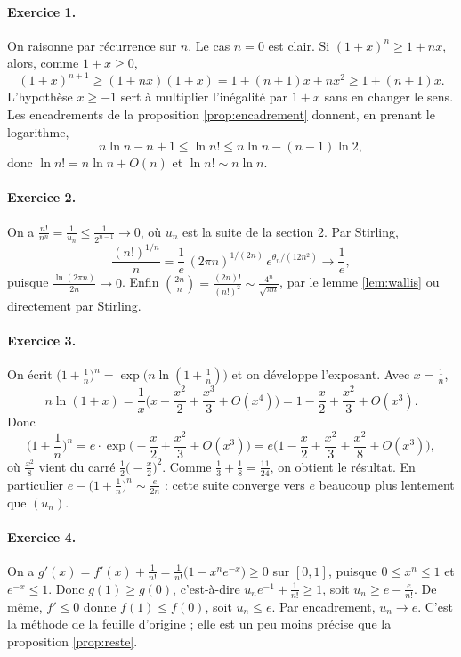 \documentclass[11pt,a4paper]{article}
\theoremstyle{plain}
\theoremstyle{definition}
\theoremstyle{remark}
\begin{document}
\paragraph{Exercice 1.} On raisonne par récurrence sur $n$. Le cas $n=0$ est clair. Si $(1+x)^n\geq1+nx$, alors, comme $1+x\geq0$,
\[
  (1+x)^{n+1}\geq(1+nx)(1+x)=1+(n+1)x+nx^2\geq1+(n+1)x .
\]
L'hypothèse $x\geq-1$ sert à multiplier l'inégalité par $1+x$ sans en changer le sens. Les encadrements de la proposition \ref{prop:encadrement} donnent, en prenant le logarithme,
\[
  n\ln n-n+1\leq\ln n!\leq n\ln n-(n-1)\ln2 ,
\]
donc $\ln n!=n\ln n+O(n)$ et $\ln n!\sim n\ln n$.

\paragraph{Exercice 2.} On a $\frac{n!}{n^n}=\frac1{u_n}\leq\frac1{2^{n-1}}\to0$, où $u_n$ est la suite de la section 2. Par Stirling,
\[
  \frac{(n!)^{1/n}}n=\frac1e\,(2\pi n)^{1/(2n)}\,e^{\theta_n/(12n^2)}\longrightarrow\frac1e ,
\]
puisque $\frac{\ln(2\pi n)}{2n}\to0$. Enfin $\binom{2n}n=\frac{(2n)!}{(n!)^2}\sim\frac{4^n}{\sqrt{\pi n}}$, par le lemme \ref{lem:wallis} ou directement par Stirling.

\paragraph{Exercice 3.} On écrit $\big(1+\frac1n\big)^n=\exp\big(n\ln(1+\frac1n)\big)$ et on développe l'exposant. Avec $x=\frac1n$,
\[
  n\ln(1+x)=\frac1x\Big(x-\frac{x^2}2+\frac{x^3}3+O(x^4)\Big)=1-\frac x2+\frac{x^2}3+O(x^3).
\]
Donc
\[
  \Big(1+\frac1n\Big)^n=e\cdot\exp\Big(-\frac x2+\frac{x^2}3+O(x^3)\Big)
  =e\Big(1-\frac x2+\frac{x^2}3+\frac{x^2}8+O(x^3)\Big),
\]
où $\frac{x^2}8$ vient du carré $\frac12\big(-\frac x2\big)^2$. Comme $\frac13+\frac18=\frac{11}{24}$, on obtient le résultat. En particulier $e-\big(1+\frac1n\big)^n\sim\frac e{2n}$ : cette suite converge vers $e$ beaucoup plus lentement que $(u_n)$.

\paragraph{Exercice 4.} On a $g'(x)=f'(x)+\frac1{n!}=\frac1{n!}\big(1-x^ne^{-x}\big)\geq0$ sur $[0,1]$, puisque $0\leq x^n\leq1$ et $e^{-x}\leq1$. Donc $g(1)\geq g(0)$, c'est-à-dire $u_ne^{-1}+\frac1{n!}\geq1$, soit $u_n\geq e-\frac e{n!}$. De même, $f'\leq0$ donne $f(1)\leq f(0)$, soit $u_n\leq e$. Par encadrement, $u_n\to e$. C'est la méthode de la feuille d'origine ; elle est un peu moins précise que la proposition \ref{prop:reste}.
\end{document}
